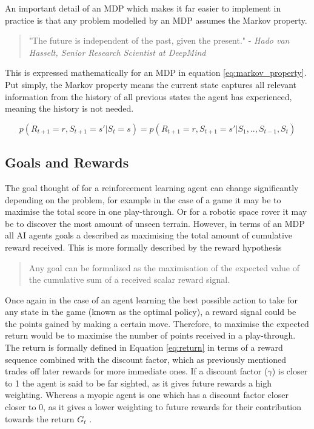 \documentclass[../dissertation.tex]{subfiles}
\begin{document}
\noindent
An important detail of an MDP which makes it far easier to implement in practice is that any problem modelled by an MDP assumes the Markov property.

\begin{quote}
"The future is independent of the past, given the present." - \textit{Hado van Hasselt, Senior Research Scientist at DeepMind} \cite{introToRL}
\end{quote}

This is expressed mathematically for an MDP in equation \ref{eq:markov_property}. Put simply, the Markov property means the current state captures all relevant information from the history of all previous states the agent has experienced, meaning the history is not needed.

\begin{equation}
\label{eq:markov_property}
p(R_{t+1} = r, S_{t+1} = s' | S_t = s) = p(R_{t+1} = r, S_{t+1} = s' | S_1, .. , S_{t-1}, S_{t})
\end{equation}

\subsection{Goals and Rewards}
The goal thought of for a reinforcement learning agent can change significantly depending on the problem, for example in the case of a game it may be to maximise the total score in one play-through. Or for a robotic space rover it may be to discover the most amount of unseen terrain. However, in terms of an MDP all AI agents goals a described as maximising the total amount of cumulative reward received. This is more formally described by the reward hypothesis \cite{sutton2011reinforcement}

\begin{quote}
Any goal can be formalized as the maximisation of the expected value of the cumulative sum of a received scalar reward signal.
\end{quote}

Once again in the case of an agent learning the best possible action to take for any state in the game (known as the optimal policy), a reward signal could be the points gained by making a certain move. Therefore, to maximise the expected return would be to maximise the number of points received in a play-through.  The return is formally defined in Equation \ref{eq:return} in terms of a reward sequence combined with the discount factor, which as previously mentioned trades off later rewards for more immediate ones. If a discount factor ($\gamma$) is closer to 1 the agent is said to be far sighted, as it gives future rewards a high weighting. Whereas a myopic agent is one which has a discount factor closer closer to 0, as it gives a lower weighting to future rewards for their contribution towards the return $G_t$ \cite{introToRL}. 
\end{document}
